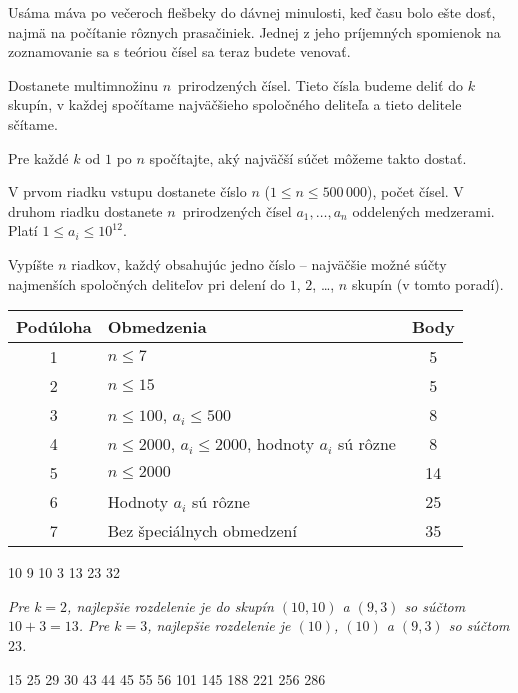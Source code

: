
\usepackage[slovak]{babel}





Usáma máva po večeroch flešbeky do dávnej minulosti, keď času bolo ešte dosť, najmä
na počítanie rôznych prasačiniek. Jednej z jeho príjemných spomienok na zoznamovanie
sa s teóriou čísel sa teraz budete venovať.


Dostanete multimnožinu $n$ prirodzených čísel. Tieto čísla budeme deliť do $k$ skupín,
v každej spočítame najväčšieho spoločného deliteľa a tieto delitele sčítame.

Pre každé $k$ od $1$ po $n$ spočítajte, aký najväčší súčet môžeme takto dostať.


V prvom riadku vstupu dostanete číslo $n$ ($1 \leq n \leq 500\,000$), počet čísel. V
druhom riadku dostanete $n$ prirodzených čísel $a_1, \ldots, a_n$ oddelených medzerami.
Platí $1 \leq a_i \leq 10^{12}$.


Vypíšte $n$ riadkov, každý obsahujúc jedno číslo -- najväčšie možné súčty
najmenších spoločných deliteľov pri delení do $1$, $2$, \ldots, $n$ skupín (v tomto poradí).


\begin{center}
  \begin{tabular}{|c|p{8cm}|c|}
    \hline
    \textbf{Podúloha} & \textbf{Obmedzenia} & \textbf{Body} \\ \hline
    1 & $n \leq 7$ & 5 \\ \hline
    2 & $n \leq 15$ & 5 \\ \hline
    3 & $n \leq 100$, $a_i \leq 500$ & 8 \\ \hline
    4 & $n \leq 2000$, $a_i \leq 2000$, hodnoty $a_i$ sú rôzne & 8 \\ \hline
    5 & $n \leq 2000$ & 14 \\ \hline
    6 & Hodnoty $a_i$ sú rôzne & 25 \\ \hline
    7 & Bez špeciálnych obmedzení & 35 \\ \hline
  \end{tabular}
\end{center}

10 9 10 3
13
23
32

\sampleEND

\noindent \textit{Pre $k = 2$, najlepšie rozdelenie je do skupín $(10,10)$ a $(9,3)$ so súčtom $10+3 = 13$. Pre $k=3$, najlepšie rozdelenie je $(10)$, $(10)$ a $(9,3)$ so súčtom $23$.}

\medskip

15 25 29 30 43 44 45 55
56
101
145
188
221
256
286

\sampleEND




